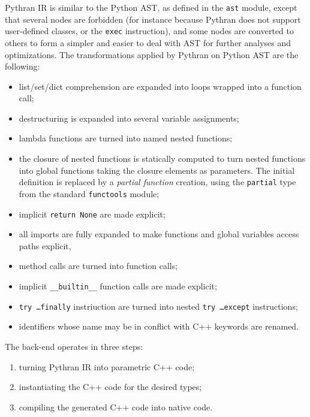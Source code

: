 \documentclass[10pt, onecolumn, preprint]{sigplanconf}
\begin{document}
Pythran IR is similar to the Python AST, as defined in the \texttt{ast} module, except
that several nodes are forbidden (for instance because Pythran does not support
user-defined classes, or the \texttt{exec} instruction), and some nodes are converted
to others to form a simpler and easier to deal with AST for further analyses and
optimizations. The transformations applied by Pythran on Python AST are the
following:

\begin{itemize}
    \item list/set/dict comprehension are expanded into loops wrapped into a function call;

    \item destructuring is expanded into several variable assignments;

    \item lambda functions are turned into named nested functions;

    \item the closure of nested functions is statically computed to turn nested
        functions into global functions taking the closure elements as
        parameters. The initial definition is replaced by a \emph{partial
        function} creation, using the \texttt{partial} type from the standard \texttt{functools} module;

    \item implicit \texttt{return None} are made explicit;

    \item all imports are fully expanded to make functions and global variables access paths explicit,

    \item method calls are turned into function calls;

    \item implicit \texttt{\_\_builtin\_\_} function calls are made explicit;

    \item \texttt{try \dots finally} instriuction are turned into nested \texttt{try \dots except} instructions;

    \item identifiers whose name may be in conflict with C++ keywords are renamed.

\end{itemize}

The back-end operates in three steps:

\begin{enumerate}

    \item turning Pythran IR into parametric C++ code;

    \item instantiating the C++ code for the desired types;

    \item compiling the generated C++ code into native code.

\end{enumerate}
\end{document}
